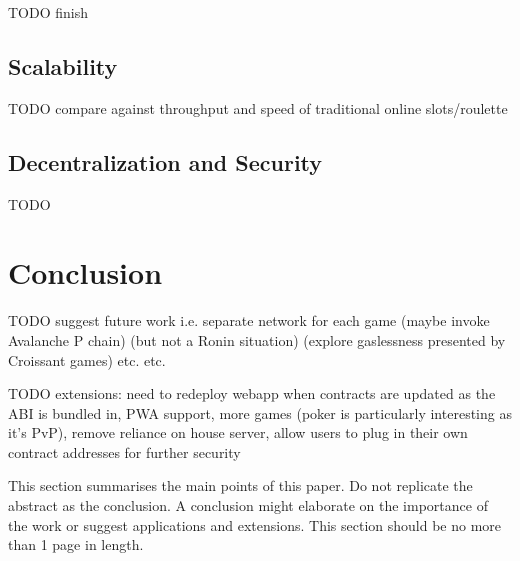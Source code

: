 \documentclass[10pt,journal,compsoc]{IEEEtran}
\begin{document}
TODO finish

\subsection{Scalability}
TODO compare against throughput and speed of traditional online slots/roulette 

\subsection{Decentralization and Security}
TODO

\section{Conclusion}
TODO suggest future work i.e. separate network for each game (maybe invoke Avalanche P chain) (but not a Ronin situation) (explore gaslessness presented by Croissant games) etc. etc.

TODO extensions: need to redeploy webapp when contracts are updated as the ABI is bundled in, PWA support, more games (poker is particularly interesting as it's PvP), remove reliance on house server, allow users to plug in their own contract addresses for further security

This section summarises the main points of this paper. Do not replicate the abstract as the conclusion. A conclusion might elaborate on the importance of the work or suggest applications and extensions. This section should be no more than 1 page in length.
\newpage



\end{document}
